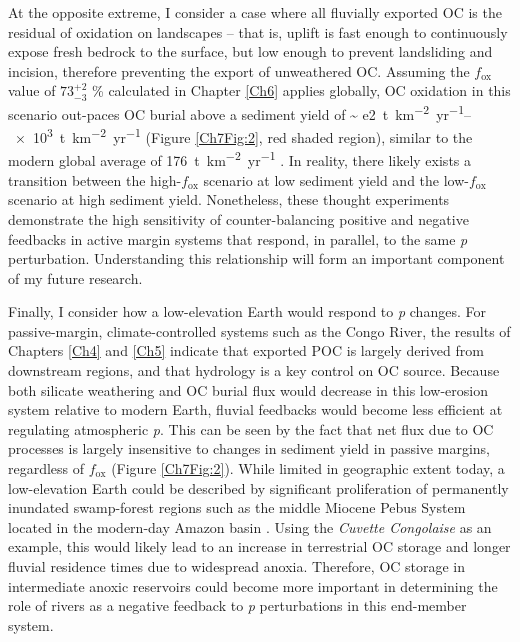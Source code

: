 At the opposite extreme, I consider a case where all fluvially exported OC is the residual of oxidation on landscapes -- that is, uplift is fast enough to continuously expose fresh bedrock to the surface, but low enough to prevent landsliding and incision, therefore preventing the export of unweathered OC. Assuming the $f_{\text{ox}}$ value of $73^{+2}_{-3}$ \% calculated in Chapter \ref{Ch6} applies globally, OC oxidation in this scenario out-paces OC burial above a sediment yield of \SIrange{~ e2}{e3}{t.km^{-2}.yr^{-1}} (Figure \ref{Ch7Fig:2}, red shaded region), similar to the modern global average of \SI{176}{t.km^{-2}.yr^{-1}} \citep{Galy:2015fx}. In reality, there likely exists a transition between the high-$f_{\text{ox}}$ scenario at low sediment yield and the low-$f_{\text{ox}}$ scenario at high sediment yield. Nonetheless, these thought experiments demonstrate the high sensitivity of counter-balancing positive and negative feedbacks in active margin systems that respond, in parallel, to the same \textit{p} perturbation. Understanding this relationship will form an important component of my future research.

Finally, I consider how a low-elevation Earth would respond to \textit{p} changes. For passive-margin, climate-controlled systems such as the Congo River, the results of Chapters \ref{Ch4} and \ref{Ch5} indicate that exported POC is largely derived from downstream regions, and that hydrology is a key control on OC source. Because both silicate weathering and OC burial flux would decrease in this low-erosion system relative to modern Earth, fluvial feedbacks would become less efficient at regulating atmospheric \textit{p}. This can be seen by the fact that net  flux due to OC processes is largely insensitive to changes in sediment yield in passive margins, regardless of $f_{\text{ox}}$ (Figure \ref{Ch7Fig:2}). While limited in geographic extent today, a low-elevation Earth could be described by significant proliferation of permanently inundated swamp-forest regions such as the middle Miocene Pebus System located in the modern-day Amazon basin \citep{Hoorn:1994vz}. Using the \textit{Cuvette Congolaise} as an example, this would likely lead to an increase in terrestrial OC storage and longer fluvial residence times due to widespread anoxia. Therefore, OC storage in intermediate anoxic reservoirs could become more important in determining the role of rivers as a negative feedback to \textit{p} perturbations in this end-member system. 

